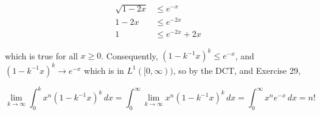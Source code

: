 \documentclass[11pt,oneside,english]{amsart}
\theoremstyle{definition}
\newcommand{\lom}[2]{\lim_{{#1}\rightarrow{#2}}}
\begin{document}
\begin{enumerate}
\begin{align*}
\sqrt{1-2x}&\leq e^{-x}\\[2mm]
1-2x&\leq e^{-2x}\\[2mm]
1&\leq e^{-2x}+2x
\end{align*}

which is true for all $x\geq 0$. Consequently, $(1-k^{-1}x)^k\leq e^{-x}$, and $(1-k^{-1}x)^k\rightarrow e^{-x}$ which is in $L^1([0,\infty))$, so by the DCT, and Exercise 29,

\[
\lom{k}{\infty} \int_0^kx^n(1-k^{-1}x)^k\,dx= \int_0^\infty\lom{k}{\infty}x^n(1-k^{-1}x)^k\,dx=\int_0^\infty x^ne^{-x}\,dx=n!
\]
\end{enumerate}
\end{document}
